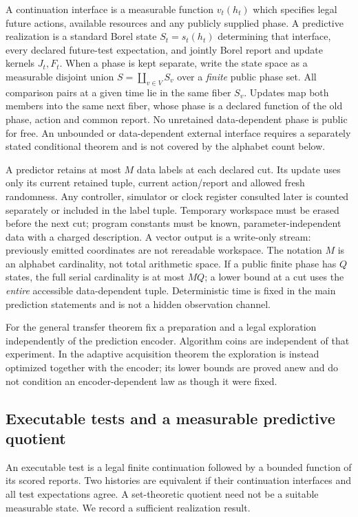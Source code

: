 A continuation interface is a measurable function $v_t(h_t)$ which specifies legal future actions, available resources and any publicly supplied phase. A predictive realization is a standard Borel state $S_t=s_t(h_t)$ determining that interface, every declared future-test expectation, and jointly Borel report and update kernels $J_t,F_t$. When a phase is kept separate, write the state space as a measurable disjoint union $S=\coprod_{v\in V}S_v$ over a \emph{finite} public phase set. All comparison pairs at a given time lie in the same fiber $S_v$. Updates map both members into the same next fiber, whose phase is a declared function of the old phase, action and common report. No unretained data-dependent phase is public for free. An unbounded or data-dependent external interface requires a separately stated conditional theorem and is not covered by the alphabet count below.

A predictor retains at most $M$ data labels at each declared cut. Its update uses only its current retained tuple, current action/report and allowed fresh randomness. Any controller, simulator or clock register consulted later is counted separately or included in the label tuple. Temporary workspace must be erased before the next cut; program constants must be known, parameter-independent data with a charged description. A vector output is a write-only stream: previously emitted coordinates are not rereadable workspace. The notation $M$ is an alphabet cardinality, not total arithmetic space. If a public finite phase has $Q$ states, the full serial cardinality is at most $MQ$; a lower bound at a cut uses the \emph{entire} accessible data-dependent tuple. Deterministic time is fixed in the main prediction statements and is not a hidden observation channel.

For the general transfer theorem fix a preparation and a legal exploration independently of the prediction encoder. Algorithm coins are independent of that experiment. In the adaptive acquisition theorem the exploration is instead optimized together with the encoder; its lower bounds are proved anew and do not condition an encoder-dependent law as though it were fixed.

\subsection{Executable tests and a measurable predictive quotient}
An executable test is a legal finite continuation followed by a bounded function of its scored reports. Two histories are equivalent if their continuation interfaces and all test expectations agree. A set-theoretic quotient need not be a suitable measurable state. We record a sufficient realization result.

